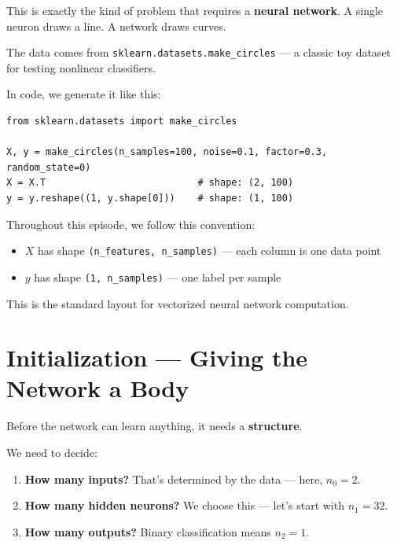 \documentclass[11pt]{article}
\begin{document}
\begin{insightbox}[title=Why This Matters]
This is exactly the kind of problem that requires a \textbf{neural network}.
A single neuron draws a line. A network draws curves.

The data comes from \texttt{sklearn.datasets.make\_circles} --- a classic toy dataset for testing nonlinear classifiers.
\end{insightbox}

In code, we generate it like this:

\begin{lstlisting}
from sklearn.datasets import make_circles

X, y = make_circles(n_samples=100, noise=0.1, factor=0.3, random_state=0)
X = X.T                           # shape: (2, 100)
y = y.reshape((1, y.shape[0]))    # shape: (1, 100)
\end{lstlisting}

\begin{defbox}[title=Convention: Data Shape]
Throughout this episode, we follow this convention:
\begin{itemize}
  \item $X$ has shape \texttt{(n\_features, n\_samples)} --- each column is one data point
  \item $y$ has shape \texttt{(1, n\_samples)} --- one label per sample
\end{itemize}
This is the standard layout for vectorized neural network computation.
\end{defbox}

\section{Initialization --- Giving the Network a Body}

Before the network can learn anything, it needs a \textbf{structure}.

We need to decide:
\begin{enumerate}
  \item \textbf{How many inputs?} That's determined by the data --- here, $n_0 = 2$.
  \item \textbf{How many hidden neurons?} We choose this --- let's start with $n_1 = 32$.
  \item \textbf{How many outputs?} Binary classification means $n_2 = 1$.
\end{enumerate}
\end{document}
